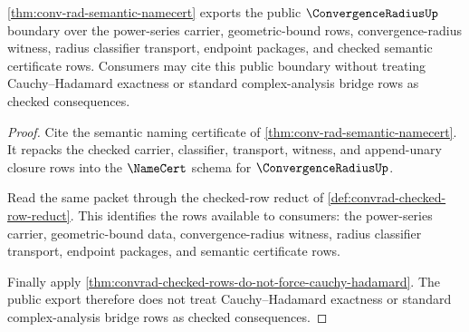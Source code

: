 \begin{theorem}
\label{thm:convergence-radius-public-export}
\autoref{thm:conv-rad-semantic-namecert} exports the public
$\ConvergenceRadiusUp$ boundary over the power-series carrier,
geometric-bound rows, convergence-radius witness, radius classifier transport,
endpoint packages, and checked semantic certificate rows. Consumers may cite
this public boundary without treating Cauchy--Hadamard exactness or standard
complex-analysis bridge rows as checked consequences.
\end{theorem}
\begin{proof}
Cite the semantic naming certificate of
\autoref{thm:conv-rad-semantic-namecert}. It repacks the checked carrier,
classifier, transport, witness, and append-unary closure rows into the
$\NameCert$ schema for $\ConvergenceRadiusUp$.

Read the same packet through the checked-row reduct of
\autoref{def:convrad-checked-row-reduct}. This identifies the rows available
to consumers: the power-series carrier, geometric-bound data,
convergence-radius witness, radius classifier transport, endpoint packages,
and semantic certificate rows.

Finally apply
\autoref{thm:convrad-checked-rows-do-not-force-cauchy-hadamard}. The public
export therefore does not treat Cauchy--Hadamard exactness or standard
complex-analysis bridge rows as checked consequences.
\end{proof}

